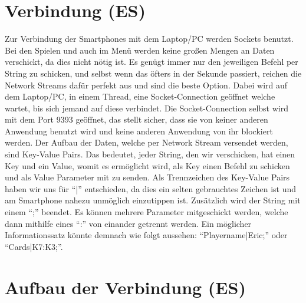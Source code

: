 \section{Verbindung (ES)} \label{verbindung}
Zur Verbindung der Smartphones mit dem Laptop/PC werden Sockets benutzt. Bei den Spielen und auch im Menü werden keine großen Mengen an Daten verschickt, da dies nicht nötig ist. Es genügt immer nur den jeweiligen Befehl per String zu schicken, und selbst wenn das öfters in der Sekunde passiert, reichen die Network Streams dafür perfekt aus und sind die beste Option. Dabei wird auf dem Laptop/PC, in einem Thread, eine Socket-Connection geöffnet welche wartet, bis sich jemand auf diese verbindet. Die Socket-Connection selbst wird mit dem Port 9393 geöffnet, das stellt sicher, dass sie von keiner anderen Anwendung benutzt wird und keine anderen Anwendung von ihr blockiert werden. Der Aufbau der Daten, welche per Network Stream versendet werden, sind Key-Value Pairs. Das bedeutet, jeder String, den wir verschicken, hat einen Key und ein Value, womit es ermöglicht wird, als Key einen Befehl zu schicken und als Value Parameter mit zu senden. Als Trennzeichen des Key-Value Pairs haben wir uns für “|” entschieden, da dies ein selten gebrauchtes Zeichen ist und am Smartphone nahezu unmöglich einzutippen ist. Zusätzlich wird der String mit einem “;” beendet. Es können mehrere Parameter mitgeschickt werden, welche dann mithilfe eines “:” von einander getrennt werden. Ein möglicher Informationssatz könnte demnach wie folgt aussehen: “Playername|Eric;” oder “Cards|K7:K3;”.
\section{Aufbau der Verbindung (ES)} 
